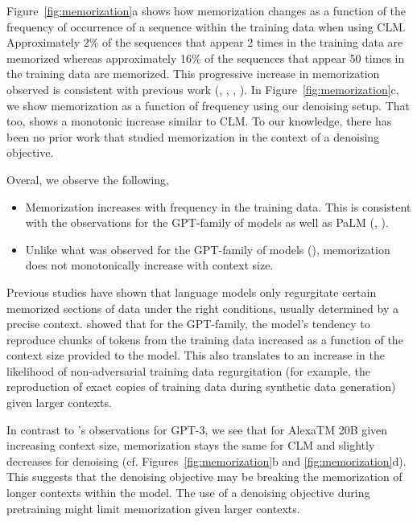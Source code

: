 Figure~\ref{fig:memorization}a shows how memorization changes as a function of the frequency of occurrence of a sequence within the training data when using CLM. Approximately 2\% of the sequences that appear 2 times in the training data are memorized whereas approximately 16\% of the sequences that appear 50 times in the training data are memorized. This progressive increase in memorization observed is consistent with previous work (\citealt{Lee2022DeduplicatingTD}, \citealt{Kandpal2022DeduplicatingTD}, \citealt{Carlini2022QuantifyingMA}, \citealt{Chowdhery2022PaLMSL}). 
In Figure~\ref{fig:memorization}c, we show memorization as a function of frequency using our denoising setup. That too, shows a monotonic increase similar to CLM. To our knowledge, there has been no prior work that studied memorization in the context of a denoising objective.

Overal, we observe the following,

\begin{itemize}
    \item Memorization increases with frequency in the training data. This is consistent with the observations for the GPT-family of models as well as PaLM (\citealt{Carlini2022QuantifyingMA}, \citealt{Chowdhery2022PaLMSL}).

    \item Unlike what was observed for the GPT-family of models (\citealt{Carlini2022QuantifyingMA}), memorization does not monotonically increase with context size. 
\end{itemize}

Previous studies have shown that language models only regurgitate certain memorized sections of data under the right conditions, usually determined by a precise context. \citet{Carlini2022QuantifyingMA} showed that for the GPT-family, the model's tendency to reproduce chunks of tokens from the training data increased as a function of the context size provided to the model. This also translates to an increase in the likelihood of non-adversarial training data regurgitation (for example, the reproduction of exact copies of training data during synthetic data generation) given larger contexts. 

In contrast to \citet{Carlini2022QuantifyingMA}'s observations for GPT-3, we see that for {AlexaTM 20B} given increasing context size, memorization stays the same for CLM and slightly decreases for denoising (cf. Figures~\ref{fig:memorization}b and \ref{fig:memorization}d). This suggests that the denoising objective may be breaking the memorization of longer contexts within the model. The use of a denoising objective during pretraining might limit memorization given larger contexts.

